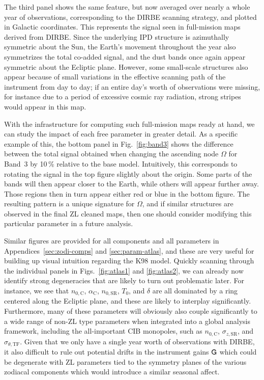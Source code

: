 \documentclass[twocolumn]{aa}
\newcommand{\G}[0]{\tens{G}}
\begin{document}
The third panel shows the same feature, but now averaged over nearly
a whole year of observations, corresponding to the DIRBE scanning 
strategy, and plotted in Galactic coordinates. This
represents the signal seen in full-mission maps derived from
DIRBE. Since the underlying IPD structure is azimuthally symmetric
about the Sun, the Earth's movement throughout the year also
symmetrizes the total co-added signal, and the dust bands once again
appear symmetric about the Ecliptic plane. However, some small-scale
structures also appear because of small variations in the effective
scanning path of the instrument from day to day; if an entire day's
worth of observations were missing, for instance due to a period of
excessive cosmic ray radiation, strong stripes would appear in this
map.

With the infrastructure for computing such full-mission maps ready at
hand, we can study the impact of each free parameter in greater
detail. As a specific example of this, the bottom panel in
Fig.~\ref{fig:band3} shows the difference between the total signal
obtained when changing the ascending node $\Omega$ for Band~3 by 10\,\%
relative to the base model. Intuitively, this corresponds to rotating
the signal in the top figure slightly about the origin. Some parts of
the bands will then appear closer to the Earth, while others will
appear further away. Those regions then in turn appear either red or
blue in the bottom figure. The resulting pattern is a unique
signature for $\Omega$, and if similar structures are observed in the
final ZL cleaned maps, then one should consider modifying this
particular parameter in a future analysis.

Similar figures are provided for all components and all parameters in
Appendices~\ref{sec:zodi-comps} and \ref{sec:param-atlas}, and these
are very useful for building up visual intuition regarding the K98
model. Quickly scanning through the individual panels in
Figs.~\ref{fig:atlas1} and \ref{fig:atlas2}, we can already now
identify strong degeneracies that are likely to turn out problematic
later. For instance, we see that $n_{0,\mathrm{C}}$,
$\alpha_\mathrm{C}$, $n_{0,\mathrm{SR}}$, $T_0$, and $\delta$ are all
dominated by a ring centered along the Ecliptic plane, and these are
likely to interplay significantly. Furthermore, many of these
parameters will obviously also couple significantly to a wide range of
non-ZL type parameters when integrated into a global analysis
framework, including the all-important CIB monopoles, such as
$n_{0,\mathrm{C}}$, $\sigma_{z,\mathrm{SR}}$, and
$\sigma_{\theta,\mathrm{TF}}$. Given that we only have a single year 
worth of observations with DIRBE, it also difficult to rule out 
potential drifts in the instrument gains $\G$ which could be 
degenerate with ZL parameters tied to the symmetry planes of the 
various zodiacal components which would introduce a similar seasonal 
affect.
\end{document}
